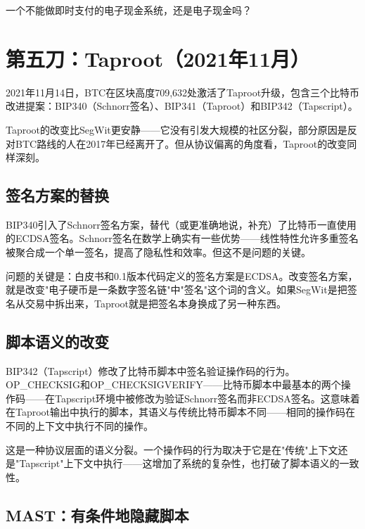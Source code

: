 \documentclass[a4paper,12pt,openany]{ctexbook}
\begin{document}
一个不能做即时支付的电子现金系统，还是电子现金吗？


\section*{第五刀：Taproot（2021年11月）}


2021年11月14日，BTC在区块高度709,632处激活了Taproot升级，包含三个比特币改进提案：BIP340（Schnorr签名）、BIP341（Taproot）和BIP342（Tapscript）。

Taproot的改变比SegWit更安静——它没有引发大规模的社区分裂，部分原因是反对BTC路线的人在2017年已经离开了。但从协议偏离的角度看，Taproot的改变同样深刻。


\subsection*{签名方案的替换}


BIP340引入了Schnorr签名方案，替代（或更准确地说，补充）了比特币一直使用的ECDSA签名。Schnorr签名在数学上确实有一些优势——线性特性允许多重签名被聚合成一个单一签名，提高了隐私性和效率。但这不是问题的关键。

问题的关键是：白皮书和0.1版本代码定义的签名方案是ECDSA。改变签名方案，就是改变"电子硬币是一条数字签名链"中"签名"这个词的含义。如果SegWit是把签名从交易中拆出来，Taproot就是把签名本身换成了另一种东西。


\subsection*{脚本语义的改变}


BIP342（Tapscript）修改了比特币脚本中签名验证操作码的行为。OP\_CHECKSIG和OP\_CHECKSIGVERIFY——比特币脚本中最基本的两个操作码——在Tapscript环境中被修改为验证Schnorr签名而非ECDSA签名。这意味着在Taproot输出中执行的脚本，其语义与传统比特币脚本不同——相同的操作码在不同的上下文中执行不同的操作。

这是一种协议层面的语义分裂。一个操作码的行为取决于它是在"传统"上下文还是"Tapscript"上下文中执行——这增加了系统的复杂性，也打破了脚本语义的一致性。


\subsection*{MAST：有条件地隐藏脚本}
\end{document}
